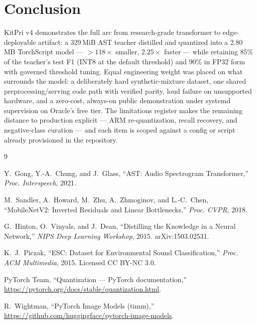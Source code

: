 \documentclass[11pt,a4paper]{article}
\begin{document}
\section{Conclusion}\label{sec:conclusion}

KitPri v4 demonstrates the full arc from research-grade transformer to
edge-deployable artifact: a 329\,MiB AST teacher distilled and quantized into
a 2.80\,MB TorchScript model --- $>118\times$ smaller, $2.25\times$ faster ---
while retaining $85\%$ of the teacher's test F1 (INT8 at the default
threshold) and $90\%$ in FP32 form with governed threshold tuning. Equal
engineering weight was placed on what surrounds the model: a deliberately
hard synthetic-mixture dataset, one shared preprocessing/serving code path
with verified parity, loud failure on unsupported hardware, and a
zero-cost, always-on public demonstration under systemd supervision on
Oracle's free tier. The limitations register makes the remaining distance to
production explicit --- ARM re-quantization, recall recovery, and negative-class
curation --- and each item is scoped against a config or script already
provisioned in the repository.

\begin{thebibliography}{9}\small

Y.~Gong, Y.-A.~Chung, and J.~Glass,
``AST: Audio Spectrogram Transformer,''
\emph{Proc. Interspeech}, 2021.

M.~Sandler, A.~Howard, M.~Zhu, A.~Zhmoginov, and L.-C.~Chen,
``MobileNetV2: Inverted Residuals and Linear Bottlenecks,''
\emph{Proc. CVPR}, 2018.

G.~Hinton, O.~Vinyals, and J.~Dean,
``Distilling the Knowledge in a Neural Network,''
\emph{NIPS Deep Learning Workshop}, 2015. arXiv:1503.02531.

K.~J.~Piczak,
``ESC: Dataset for Environmental Sound Classification,''
\emph{Proc. ACM Multimedia}, 2015. Licensed CC BY-NC 3.0.

PyTorch Team,
``Quantization --- PyTorch documentation,''
\url{https://pytorch.org/docs/stable/quantization.html}.

R.~Wightman,
``PyTorch Image Models (timm),''
\url{https://github.com/huggingface/pytorch-image-models}.

\end{thebibliography}
\end{document}
